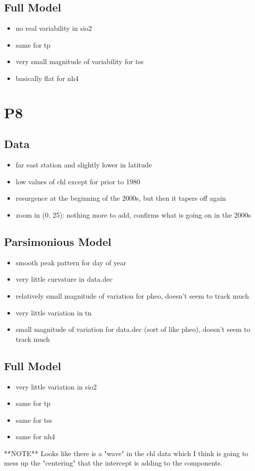 \documentclass[12pt]{amsart}
\begin{document}
\subsection{Full Model}
\begin{itemize}
\item no real variability in sio2
\item same for tp
\item very small magnitude of variability for tss
\item basically flat for nh4
\end{itemize}

\section{P8}
\subsection{Data}
\begin{itemize}
\item far east station and slightly lower in latitude
\item low values of chl except for prior to 1980
\item resurgence at the beginning of the 2000s, but then it tapers off again
\item zoom in (0, 25): nothing more to add, confirms what is going on in the 2000s
\end{itemize}
\subsection{Parsimonious Model}
\begin{itemize}
\item smooth peak pattern for day of year
\item very little curvature in data.dec
\item relatively small magnitude of variation for pheo, doesn't seem to track much
\item very little variation in tn
\item small magnitude of variation for data.dec (sort of like pheo), doesn't seem to track much
\end{itemize}
\subsection{Full Model}
\begin{itemize}
\item very little variation in sio2
\item same for tp
\item same for tss
\item same for nh4
\end{itemize}
**NOTE** Looks like there is a "wave" in the chl data which I think is going to mess up the "centering" that the intercept is adding to the components.
\end{document}
